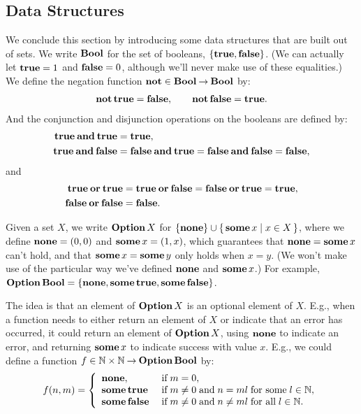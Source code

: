 \subsection{Data Structures}

%
%
We conclude this section by introducing some data structures that
are built out of sets.
We write $\mathbf{Bool}$ for the set of booleans, $\{\mathbf{true},\mathbf{false}\}$.
%
%
%
%
%
%
(We can actually let $\mathbf{true}=1$ and $\mathbf{false}=0$, although we'll
never make use of these equalities.)  We define the negation
function $\mathbf{not}\in\mathbf{Bool}\mathbin{\to}\mathbf{Bool}$ by:
\begin{gather*}
\mathbf{not}\,\mathbf{true} = \mathbf{false} , \qquad
\mathbf{not}\,\mathbf{false} = \mathbf{true} .
\end{gather*}
%
%
%
And the conjunction and disjunction operations on the booleans are
defined by:
\begin{align*}
\mathbf{true}\mathbin{\mathbf{and}}\mathbf{true} &= \mathbf{true} , \\
\mathbf{true}\mathbin{\mathbf{and}}\mathbf{false} &= \mathbf{false}\mathbin{\mathbf{and}}\mathbf{true} = \mathbf{false}\mathbin{\mathbf{and}}\mathbf{false} = \mathbf{false} ,
\end{align*}
%
%
%
and
%
%
%
%
\begin{align*}
\mathbf{true}\mathbin{\mathbf{or}}\mathbf{true} &= \mathbf{true}\mathbin{\mathbf{or}}\mathbf{false} = \mathbf{false}\mathbin{\mathbf{or}}\mathbf{true} = \mathbf{true} , \\
\mathbf{false}\mathbin{\mathbf{or}}\mathbf{false} &= \mathbf{false} .
\end{align*}

Given a set $X$, we write $\mathbf{Option}\,X$ for
%
%
%
%
%
%
%
$\{\mathbf{none}\}\cup\{ \, \mathbf{some}\,x \mid x\in X \, \}$, where we define $\mathbf{none}=(0,0)$
and $\mathbf{some}\,x=(1,x)$, which guarantees that $\mathbf{none}=\mathbf{some}\,x$ can't
hold, and that $\mathbf{some}\,x=\mathbf{some}\,y$ only holds when $x=y$.
(We won't make use of the particular way we've defined $\mathbf{none}$ and
$\mathbf{some}\,x$.)
For example, $\mathbf{Option}\,\mathbf{Bool}=\{\mathbf{none},\mathbf{some}\,\mathbf{true},\mathbf{some}\,\mathbf{false}\}$.

The idea is that an element of $\mathbf{Option}\,X$ is an optional element
of $X$.  E.g., when a function needs to either return an element of $X$
or indicate that an error has occurred, it could return an
element of $\mathbf{Option}\,X$, using $\mathbf{none}$ to indicate an error,
and returning $\mathbf{some}\,x$ to indicate success with value $x$.
E.g., we could define a function
$f\in\mathbb{N}\times\mathbb{N}\mathbin{\to}\mathbf{Option}\,\mathbf{Bool}$ by:
\begin{gather*}
f(n,m) =
\left\{ \begin{array}{ll}
\mathbf{none}, & \;\allowbreak\mbox{if}\allowbreak\;m=0, \\
\mathbf{some}\,\mathbf{true} & \;\allowbreak\mbox{if}\allowbreak\;m\neq 0 \;\allowbreak\mbox{and}\allowbreak\;
n=ml \;\allowbreak\mbox{for some}\allowbreak\;l\in\mathbb{N}, \\
\mathbf{some}\,\mathbf{false} & \;\allowbreak\mbox{if}\allowbreak\;m\neq 0 \;\allowbreak\mbox{and}\allowbreak\;
n\neq ml \;\allowbreak\mbox{for all}\allowbreak\;l\in\mathbb{N} .
\end{array} \right.  
\end{gather*}

